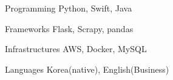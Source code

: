 

\begin{cvskills}

  \cvskill
    {Programming} %
    {Python, Swift, Java} %

  \cvskill
    {Frameworks} %
    {Flask, Scrapy, pandas} %

  \cvskill
    {Infrastructures} %
    {AWS, Docker, MySQL} %

  \cvskill
    {Languages} %
    {Korea(native), English(Business)} %

\end{cvskills}
